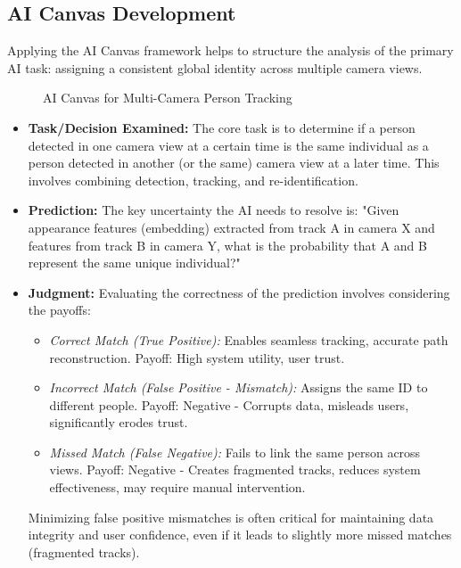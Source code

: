 \subsection{AI Canvas Development}
\label{subsection:ai_canvas_dev}
Applying the AI Canvas framework helps to structure the analysis of the primary AI task: assigning a consistent global identity across multiple camera views.
\begin{figure}[!htb] %
    \centering

    \caption{AI Canvas for Multi-Camera Person Tracking}
    \label{fig:ai_canvas}
\end{figure}
\begin{itemize}
    \item \textbf{Task/Decision Examined:} The core task is to determine if a person detected in one camera view at a certain time is the same individual as a person detected in another (or the same) camera view at a later time. This involves combining detection, tracking, and re-identification.
    \item \textbf{Prediction:} The key uncertainty the AI needs to resolve is: "Given appearance features (embedding) extracted from track A in camera X and features from track B in camera Y, what is the probability that A and B represent the same unique individual?"

    \item \textbf{Judgment:} Evaluating the correctness of the prediction involves considering the payoffs:
        \begin{itemize}
            \item \textit{Correct Match (True Positive):} Enables seamless tracking, accurate path reconstruction. Payoff: High system utility, user trust.
            \item \textit{Incorrect Match (False Positive - Mismatch):} Assigns the same ID to different people. Payoff: Negative - Corrupts data, misleads users, significantly erodes trust.
            \item \textit{Missed Match (False Negative):} Fails to link the same person across views. Payoff: Negative - Creates fragmented tracks, reduces system effectiveness, may require manual intervention.
        \end{itemize}
        Minimizing false positive mismatches is often critical for maintaining data integrity and user confidence, even if it leads to slightly more missed matches (fragmented tracks).


\end{itemize}
